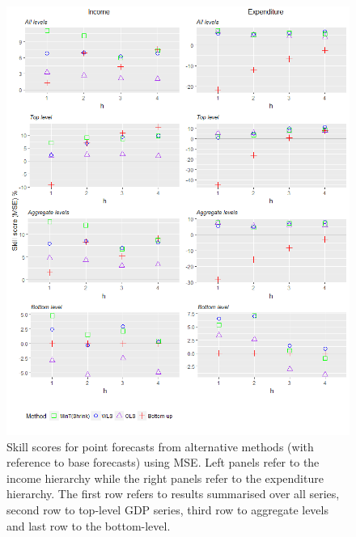 \documentclass[graybox]{svmult}
\begin{document}
\begin{figure}[t]
	\centering
	\small
	\includegraphics[width=\textwidth]{Figs/Results/PointF_MSE.png}
	\caption{Skill scores for point forecasts from alternative methods (with reference to base forecasts) using MSE. Left panels refer to the income hierarchy while the right panels refer to the expenditure hierarchy. The first row refers to results summarised over all series, second row to top-level GDP series, third row to aggregate levels and last row to the bottom-level.}
	\label{fig: PointF_MSE}
\end{figure}
\end{document}
